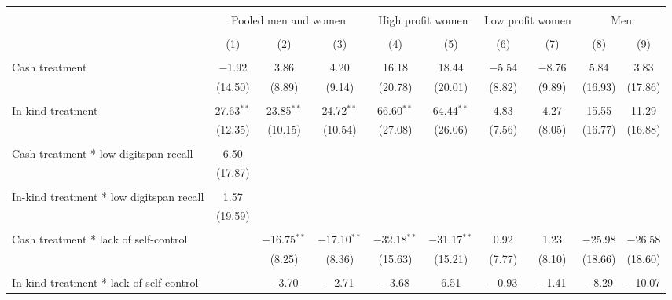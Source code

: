 \documentclass{report}
\begin{document}
\pagestyle{empty}

\begin{table}[!htbp] \centering 
  \caption{} 
  \label{} 
\begin{tabular}{@{\extracolsep{5pt}}lccccccccc} 
\\[-1.8ex]\hline 
\hline \\[-1.8ex] 
 & \multicolumn{3}{c}{Pooled men and women} & \multicolumn{2}{c}{High profit women} & \multicolumn{2}{c}{Low profit women} & \multicolumn{2}{c}{Men} \\ 
\\[-1.8ex] & (1) & (2) & (3) & (4) & (5) & (6) & (7) & (8) & (9)\\ 
\hline \\[-1.8ex] 
 Cash treatment & $-$1.92 & 3.86 & 4.20 & 16.18 & 18.44 & $-$5.54 & $-$8.76 & 5.84 & 3.83 \\ 
  & (14.50) & (8.89) & (9.14) & (20.78) & (20.01) & (8.82) & (9.89) & (16.93) & (17.86) \\ 
  & & & & & & & & & \\ 
 In-kind treatment & 27.63$^{**}$ & 23.85$^{**}$ & 24.72$^{**}$ & 66.60$^{**}$ & 64.44$^{**}$ & 4.83 & 4.27 & 15.55 & 11.29 \\ 
  & (12.35) & (10.15) & (10.54) & (27.08) & (26.06) & (7.56) & (8.05) & (16.77) & (16.88) \\ 
  & & & & & & & & & \\ 
 Cash treatment * low digitspan recall & 6.50 &  &  &  &  &  &  &  &  \\ 
  & (17.87) &  &  &  &  &  &  &  &  \\ 
  & & & & & & & & & \\ 
 In-kind treatment * low digitspan recall & 1.57 &  &  &  &  &  &  &  &  \\ 
  & (19.59) &  &  &  &  &  &  &  &  \\ 
  & & & & & & & & & \\ 
 Cash treatment * lack of self-control &  & $-$16.75$^{**}$ & $-$17.10$^{**}$ & $-$32.18$^{**}$ & $-$31.17$^{**}$ & 0.92 & 1.23 & $-$25.98 & $-$26.58 \\ 
  &  & (8.25) & (8.36) & (15.63) & (15.21) & (7.77) & (8.10) & (18.66) & (18.60) \\ 
  & & & & & & & & & \\ 
 In-kind treatment * lack of self-control &  & $-$3.70 & $-$2.71 & $-$3.68 & 6.51 & $-$0.93 & $-$1.41 & $-$8.29 & $-$10.07 \\ 

\end{tabular}
\end{table}
\end{document}
